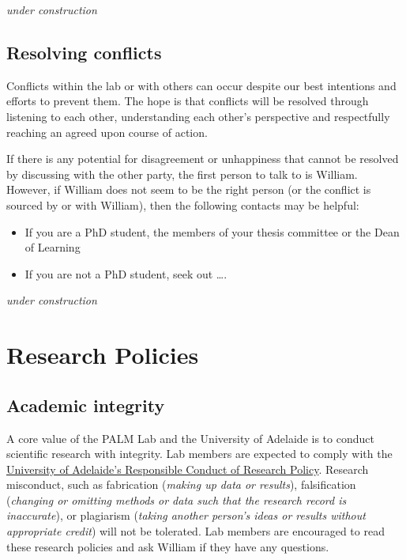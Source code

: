 \documentclass[
]{book}
\providecommand{\tightlist}{%
  \setlength{\itemsep}{0pt}\setlength{\parskip}{0pt}}
\begin{document}
\emph{under construction}

\hypertarget{conflicts}{%
\section{Resolving conflicts}\label{conflicts}}

Conflicts within the lab or with others can occur despite our best intentions and efforts to prevent them. The hope is that conflicts will be resolved through listening to each other, understanding each other's perspective and respectfully reaching an agreed upon course of action.

If there is any potential for disagreement or unhappiness that cannot be resolved by discussing with the other party, the first person to talk to is William. However, if William does not seem to be the right person (or the conflict is sourced by or with William), then the following contacts may be helpful:

\begin{itemize}
\tightlist
\item
  If you are a PhD student, the members of your thesis committee or the Dean of Learning
\item
  If you are not a PhD student, seek out \ldots.
\end{itemize}

\emph{under construction}

\hypertarget{research-policies}{%
\chapter{Research Policies}\label{research-policies}}

\hypertarget{academic-integrity}{%
\section{Academic integrity}\label{academic-integrity}}

A core value of the PALM Lab and the University of Adelaide is to conduct scientific research with integrity. Lab members are expected to comply with the \href{https://www.adelaide.edu.au/policies/96/}{University of Adelaide's Responsible Conduct of Research Policy}. Research misconduct, such as fabrication (\emph{making up data or results}), falsification (\emph{changing or omitting methods or data such that the research record is inaccurate}), or plagiarism (\emph{taking another person's ideas or results without appropriate credit}) will not be tolerated. Lab members are encouraged to read these research policies and ask William if they have any questions.
\end{document}
